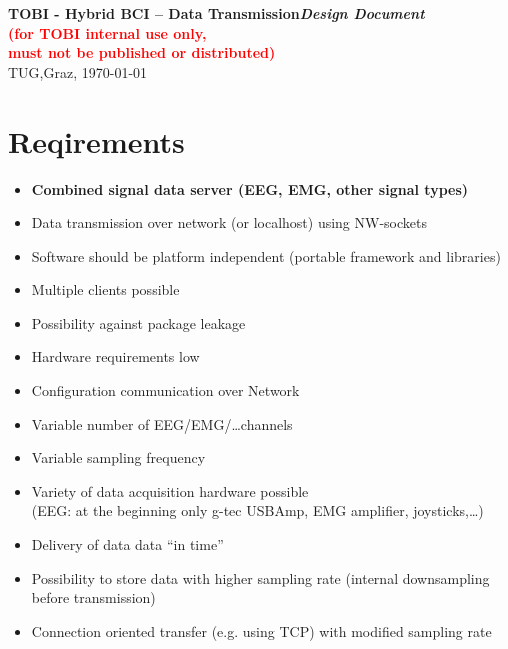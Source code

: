 \documentclass[11pt]{scrartcl}
\begin{document}
  \begin{center}
  \textbf{\Large{TOBI - Hybrid BCI -- Data Transmission\linebreak \textit{Design Document}}\\  \vspace*{0.3cm}
                  \textcolor{red}{(for TOBI internal use only,\\ must not be published or distributed)} }\\
    \vspace*{0.2cm}
    TUG,\quad Graz, \today{}
  \end{center}


\section{Reqirements}
  \begin{itemize}
    \item \textbf{Combined signal data server (EEG, EMG, other signal types)}
    \newline
    \item Data transmission over network (or localhost) using NW-sockets
    \item Software should be platform independent (portable framework and libraries)
    \item Multiple clients possible
    \item Possibility against package leakage
    \item Hardware requirements low
    \item Configuration communication over Network
    \item Variable number of EEG/EMG/\dots channels
    \item Variable sampling frequency
    \item Variety of data acquisition hardware possible\\
      \hspace*{0.2cm} (EEG: at the beginning only g-tec USBAmp, EMG amplifier, joysticks,\dots)
    \item Delivery of data data ``in time''
    \newline
    \item Possibility to store data with higher sampling rate
      \hspace*{0.2cm} (internal downsampling before transmission)
    \item Connection oriented transfer (e.g. using TCP) with modified sampling rate
  \end{itemize}
\end{document}
